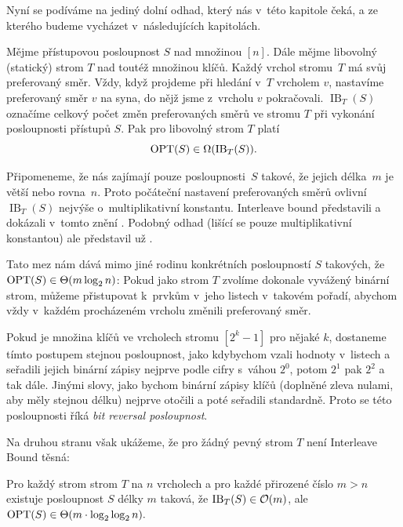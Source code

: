 Nyní se podíváme na jediný dolní odhad, který nás v~této kapitole čeká, a ze kterého budeme vycházet v~následujících kapitolách.

\def\ib{\operatorname{IB}}

\begin{veta}
Mějme přístupovou posloupnost $S$ nad množinou $[n]$. Dále mějme libovolný
(statický) strom $T$ nad toutéž množinou klíčů. Každý vrchol stromu~$T$ má svůj
preferovaný směr. Vždy, když projdeme při hledání v~$T$ vrcholem $v$, nastavíme preferovaný směr
$v$ na syna, do nějž jsme z~vrcholu $v$ pokračovali. $\ib_T(S)$ označíme
celkový počet změn preferovaných směrů ve stromu $T$ při vykonání posloupnosti přístupů $S$. Pak pro
libovolný strom $T$ platí $$\opt(S) \in \Omega(\ib_T(S)).$$ 
\end{veta}

Připomeneme, že nás zajímají pouze
posloupnosti~$S$ takové, že jejich délka~$m$ je větší nebo rovna~$n$. Proto počáteční
nastavení preferovaných směrů ovlivní $\ib_T(S)$ nejvýše o~multiplikativní
konstantu.
Interleave bound představili a dokázali v~tomto znění \citet{tango}. Podobný odhad (lišící se pouze multiplikativní konstantou) ale představil už \citet{interleave}.

Tato mez nám dává mimo jiné rodinu konkrétních posloupností $S$ takových, že
$\opt(S)\in\Theta(m\log n)$: Pokud jako strom $T$ zvolíme dokonale vyvážený
binární strom, můžeme přistupovat k~prvkům v~jeho listech v~takovém pořadí,
abychom vždy v~každém procházeném vrcholu změnili preferovaný směr.

Pokud je množina klíčů ve vrcholech stromu $[2^k-1]$ pro nějaké $k$, dostaneme
tímto postupem stejnou posloupnost, jako kdybychom vzali hodnoty v~listech a
seřadili jejich binární zápisy nejprve podle cifry s~váhou $2^0$, potom $2^1$
pak $2^2$ a tak dále. Jinými slovy, jako bychom binární zápisy klíčů (doplněné
zleva nulami, aby měly stejnou délku) nejprve otočili a poté seřadili
standardně. Proto se této posloupnosti říká \emph{bit reversal posloupnost}.

Na druhou stranu však ukážeme, že pro žádný pevný strom $T$ není Interleave Bound těsná:
\begin{tvrz}
Pro každý strom strom $T$ na $n$ vrcholech a pro každé přirozené číslo $m>n$ existuje posloupnost $S$ délky $m$ taková, že $\ib_T(S) \in \o(m)$, ale $\opt(S) \in \Theta(m\cdot\log\log n).$ 
\end{tvrz}


